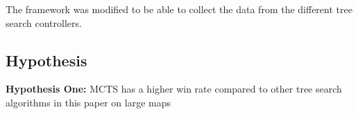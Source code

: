 \documentclass[journal]{IEEEtran}
\begin{document}
	The framework was modified to be able to collect the data from the different tree search controllers.
	
	
	











\subsection{Hypothesis}

	\textbf{Hypothesis One:}
		MCTS has a higher win rate compared to other tree search algorithms in this paper on large maps
\end{document}
